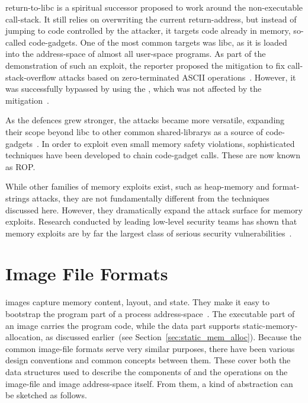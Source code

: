 \Gls{return-to-libc} is a spiritual successor proposed to work around the non-executable \gls{call-stack}. It still relies on overwriting the current \gls{return-address}, but instead of jumping to code controlled by the attacker, it targets code already in memory, so-called \glspl{code-gadget}. One of the most common targets was \gls{libc}, as it is loaded into the \gls{address-space} of almost all \gls{user-space} programs. As part of the demonstration of such an exploit, the reporter proposed the mitigation to fix \gls{call-stack-overflow} attacks based on zero-terminated \gls{ASCII} operations~\cite{libc-zero-byte}. However, it was successfully bypassed by using the , which was not affected by the mitigation~\cite{libc-ex}.

As the defences grew stronger, the attacks became more versatile, expanding their scope beyond \gls{libc} to other common \glspl{shared-library} as a source of \glspl{code-gadget}~\cite{10.1007/978-3-642-33338-5_5}. In order to exploit even small memory safety violations, sophisticated techniques have been developed to chain \gls{code-gadget} calls. These are now known as \gls{ROP}.

While other families of memory exploits exist, such as \gls{heap-memory} and \glspl{format-string} attacks, they are not fundamentally different from the techniques discussed here. However, they dramatically expand the attack surface for memory exploits. Research conducted by leading low-level security teams has shown that memory exploits are by far the largest class of serious security vulnerabilities~\cite{10.1007/978-3-642-33338-5_5,mem-tag,gpz-zero-days,apple-mem-alloc}.

\section{Image File Formats}

\Glspl{image} capture memory content, layout, and state. They make it easy to bootstrap the program part of a process \gls{address-space}~\cite{levine2000linkers}. The executable part of an \gls{image} carries the program code, while the data part supports \gls{static-memory-allocation}, as discussed earlier~(see Section~\ref{sec:static_mem_alloc}). Because the common \gls{image-file} formats serve very similar purposes, there have been various design conventions and common concepts between them. These cover both the data structures used to describe the components of and the operations on the \gls{image-file} and \gls{image} \gls{address-space} itself. From them, a kind of abstraction can be sketched as follows.

